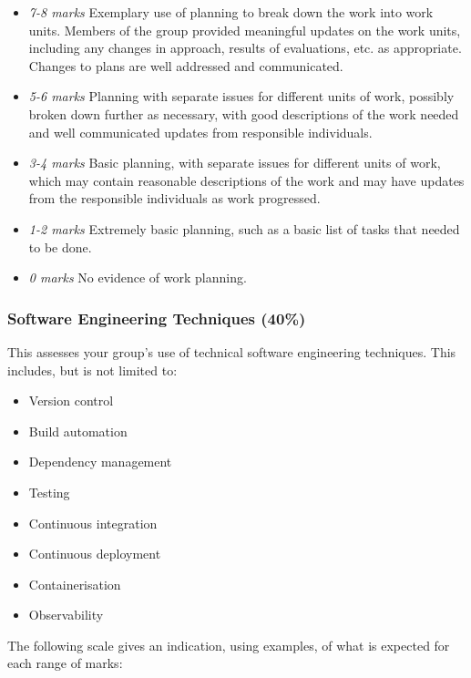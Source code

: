 \begin{itemize}
    \item \emph{7-8 marks} Exemplary use of planning to break down the work into work units. Members of the group provided meaningful updates on the work units, including any changes in approach, results of evaluations, etc. as appropriate. Changes to plans are well addressed and communicated.
    \item \emph{5-6 marks} Planning with separate issues for different units of work, possibly broken down further as necessary, with good descriptions of the work needed and well communicated updates from responsible individuals.
    \item \emph{3-4 marks} Basic planning, with separate issues for different units of work, which may contain reasonable descriptions of the work and may have updates from the responsible individuals as work progressed.
    \item \emph{1-2 marks} Extremely basic planning, such as a basic list of tasks that needed to be done.
    \item \emph{0 marks} No evidence of work planning.
\end{itemize}

\subsubsection{Software Engineering Techniques (40\%)}

This assesses your group's use of technical software engineering techniques. This includes, but is not limited to:

\begin{itemize}
    \item Version control
    \item Build automation
    \item Dependency management
    \item Testing
    \item Continuous integration
    \item Continuous deployment
    \item Containerisation
    \item Observability
\end{itemize}

The following scale gives an indication, using examples, of what is expected for each range of marks:

